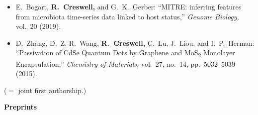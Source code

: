 \documentclass[10pt]{article}
\begin{document}
\begin{itemize}[leftmargin=*]
\item {\color{gray} E.\ Bogart, \textbf{\color{black}R.\ Creswell,} and G.\ K.\ Gerber:} ``MITRE: inferring features from microbiota time-series data linked to host status,'' \emph{Genome Biology,} vol.\ 20 (2019).

\item {\color{gray} D.\ Zhang, D.\ Z.-R.\ Wang, \textbf{\color{black}R.\ Creswell,} C.\ Lu, J.\ Liou, and I.\ P.\ Herman:} ``Passivation of CdSe Quantum Dots by Graphene and MoS\textsubscript{2} Monolayer Encapsulation,'' \emph{Chemistry of Materials,} vol.\ 27, no.\ 14, pp.\ 5032--5039 (2015).
\end{itemize}
\hfill(\textsuperscript{\dag}$=$ joint first authorship.)



\vspace*{.4cm}
\noindent\textbf{Preprints}
\vspace*{.5cm}
\end{document}

